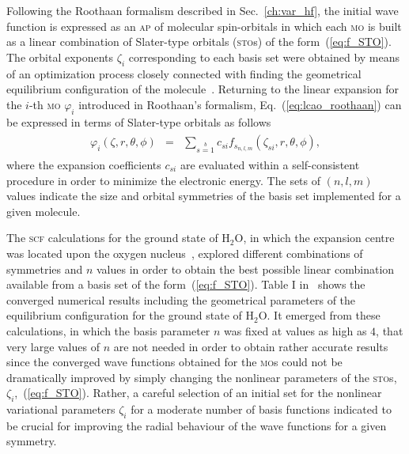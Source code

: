 Following the Roothaan formalism described in Sec.~\ref{ch:var_hf},
the initial wave function is expressed as an \textsc{ap} of molecular
spin-orbitals in which each \textsc{mo} is built as a linear
combination of Slater-type orbitals (\textsc{sto}s) of the
form~(\ref{eq:f_STO}). The orbital exponents $\zeta_{i}$ corresponding
to each basis set were obtained by means of an optimization process
closely connected with finding the geometrical equilibrium
configuration of the
molecule~\cite{Moccia_JCP_2164,Moccia_1964}. Returning to the linear
expansion for the $i$-th \textsc{mo} $\varphi_{i}$ introduced in
Roothaan's formalism, Eq.~(\ref{eq:lcao_roothaan}) can be expressed in
terms of Slater-type orbitals as follows
%
\begin{eqnarray}
  \begin{split}
    \varphi_{i}(\zeta,r,\theta,\phi) & = &
    \sum\limits_{s=1}\limits^{b} c_{si} f_{s_{n,l,m}}(\zeta_{si},r,\theta,\phi),
  \end{split}
  \label{eq:STO_expansion}
\end{eqnarray}
%
where the expansion coefficients $c_{si}$ are evaluated within a
self-consistent procedure in order to minimize the electronic
energy. The sets of $(n,l,m)$ values indicate the size and orbital
symmetries of the basis set implemented for a given molecule.

The \textsc{scf} calculations for the ground state of H$_{2}$O, in
which the expansion centre was located upon the oxygen
nucleus~\cite{Moccia_1964}, explored different combinations of
symmetries and $n$ values in order to obtain the best possible linear
combination available from a basis set of the
form~(\ref{eq:f_STO}). Table I in~\cite{Moccia_1964} shows the
converged numerical results including the geometrical parameters of
the equilibrium configuration for the ground state of H$_{2}$O. It
emerged from these calculations, in which the basis parameter $n$ was
fixed at values as high as $4$, that very large values of $n$ are not
needed in order to obtain rather accurate results since the converged
wave functions obtained for the \textsc{mo}s could not be dramatically
improved by simply changing the nonlinear parameters of the
\textsc{sto}s, $\zeta_{i}$,~(\ref{eq:f_STO}). Rather, a careful
selection of an initial set for the nonlinear variational parameters
$\zeta_{i}$ for a moderate number of basis functions indicated to be
crucial for improving the radial behaviour of the wave functions for a
given symmetry.

